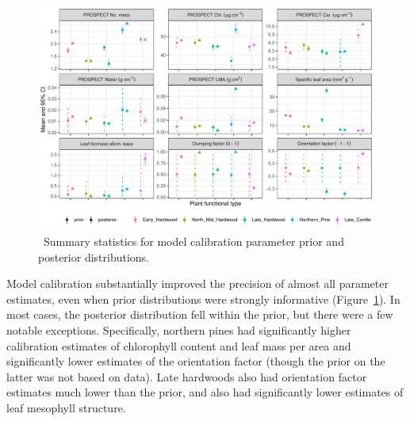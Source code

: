 \begin{figure}
  \centering
  \includegraphics[width=\textwidth]{4_edr/figures/explore_spectra/pda_summary.pdf}
  \caption{\
    Summary statistics for model calibration parameter prior and posterior distributions.
  }\label{fig:pda_posteriors}
\end{figure}

Model calibration substantially improved the precision of almost all parameter estimates, even when prior distributions were strongly informative (Figure~\ref{fig:pda_posteriors}).
In most cases, the posterior distribution fell within the prior, but there were a few notable exceptions.
Specifically, northern pines had significantly higher calibration estimates of chlorophyll content and leaf mass per area and significantly lower estimates of the orientation factor (though the prior on the latter was not based on data).
Late hardwoods also had orientation factor estimates much lower than the prior, and also had significantly lower estimates of leaf mesophyll structure.

